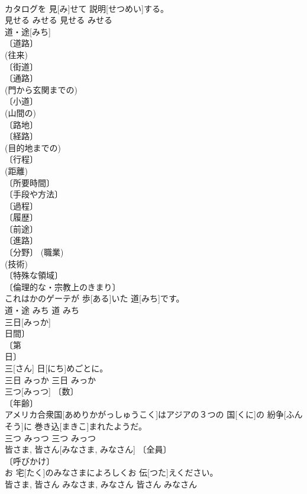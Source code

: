 \documentclass[8pt]{extreport}
\begin{document}
\begin{CJK}{UTF8}{min}
\\	カタログを 見[み]せて 説明[せつめい]する。	
\\	見せる	みせる	見せる	みせる	
\\	道・途[みち]	
\\	〔道路〕 
\\	(往来) 
\\	〔街道〕 
\\	〔通路〕 
\\	(門から玄関までの) 
\\	〔小道〕 
\\	(山間の) 
\\	〔路地〕 
\\	〔経路〕 
\\	(目的地までの) 
\\	〔行程〕 
\\	(距離) 
\\	〔所要時間〕 
\\	〔手段や方法〕 
\\	〔過程〕 
\\	〔履歴〕 
\\	〔前途〕 
\\	〔進路〕 
\\	〔分野〕 (職業) 
\\	(技術) 
\\	〔特殊な領域〕 
\\	〔倫理的な・宗教上のきまり〕 
\\	[⇒みちならぬ]	これはかのゲーテが 歩[ある]いた 道[みち]です。	
\\	道・途	みち	道	みち	
\\	三日[みっか]	
\\	日間〕 
\\	〔第 
\\	日〕 
\\	三[さん] 日[にち]めごとに。	
\\	三日	みっか	三日	みっか	
\\	三つ[みっつ]	〔数〕 
\\	〔年齢〕 
\\	アメリカ合衆国[あめりかがっしゅうこく]はアジアの３つの 国[くに]の 紛争[ふんそう]に 巻き込[まきこ]まれたようだ。	
\\	三つ	みっつ	三つ	みっつ	
\\	皆さま, 皆さん[みなさま, みなさん]	〔全員〕 
\\	〔呼びかけ〕 
\\	お 宅[たく]のみなさまによろしくお 伝[つた]えください。	
\\	皆さま, 皆さん	みなさま, みなさん	皆さん	みなさん	

\end{CJK}
\end{document}
